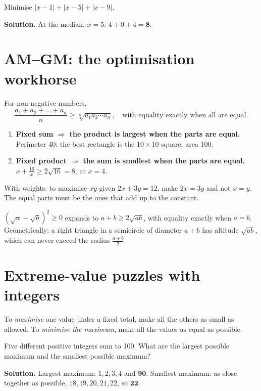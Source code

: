 \documentclass[11pt,a4paper,openany]{report}
\begin{document}
\begin{example}
Minimise $|x-1|+|x-5|+|x-9|$.

\textbf{Solution.} At the median, $x=5$: $4+0+4=\mathbf{8}$.
\end{example}

\section{AM--GM: the optimisation workhorse}
For non-negative numbers,
\[\frac{a_1+a_2+\dots+a_n}{n}\ge\sqrt[n]{a_1a_2\cdots a_n},\quad\text{with equality exactly when all are equal.}\]
\begin{idea}
\begin{enumerate}[nosep]
\item \textbf{Fixed sum $\Rightarrow$ the product is largest when the parts are equal.} Perimeter 40: the best rectangle is the $10\times10$ square, area 100.
\item \textbf{Fixed product $\Rightarrow$ the sum is smallest when the parts are equal.} $x+\frac{16}x\ge2\sqrt{16}=8$, at $x=4$.
\end{enumerate}
With weights: to maximise $xy$ given $2x+3y=12$, make $2x=3y$ and not $x=y$. The equal parts must be the ones that add up to the constant.
\end{idea}
\begin{why}
$(\sqrt a-\sqrt b)^2\ge0$ expands to $a+b\ge2\sqrt{ab}$, with equality exactly when $a=b$. Geometrically: a right triangle in a semicircle of diameter $a+b$ has altitude $\sqrt{ab}$, which can never exceed the radius $\frac{a+b}2$.
\end{why}

\section{Extreme-value puzzles with integers}
\begin{idea}
To \emph{maximise} one value under a fixed total, make all the others as small as allowed. To \emph{minimise the maximum}, make all the values as equal as possible.
\end{idea}
\begin{example}
Five different positive integers sum to 100. What are the largest possible maximum and the smallest possible maximum?

\textbf{Solution.} Largest maximum: $1,2,3,4$ and $\mathbf{90}$. Smallest maximum: as close together as possible, $18,19,20,21,22$, so $\mathbf{22}$.
\end{example}
\end{document}
